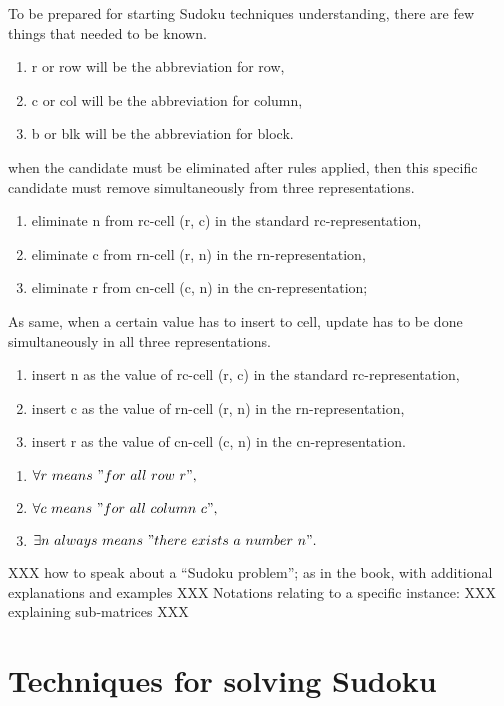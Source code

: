 \documentclass[11pt]{report}
\begin{document}
To be prepared for starting Sudoku techniques understanding, there are few things that needed to be known.
\begin{enumerate}
\item r or row will be the abbreviation for row,
\item c or col will be the abbreviation for column,
\item b or blk will be the abbreviation for block.
\end{enumerate}
when the candidate must be eliminated after rules applied, then this specific candidate must remove simultaneously from three representations.
\begin{enumerate}
\item eliminate n from rc-cell (r, c) in the standard rc-representation,
\item eliminate c from rn-cell (r, n) in the rn-representation,
\item eliminate r from cn-cell (c, n) in the cn-representation;
\end{enumerate}
As same, when a certain value has to insert to cell, update has to be done simultaneously in all three representations.
\begin{enumerate}
\item insert n as the value of rc-cell (r, c) in the standard rc-representation,
\item insert c as the value of rn-cell (r, n) in the rn-representation,
\item insert r as the value of cn-cell (c, n) in the cn-representation.
\end{enumerate}
\begin{enumerate}
\item $\forall r\ means\ "for\ all\ row\ r",$
\item $\forall c\ means\ "for\ all\ column\ c",$
\item $\exists n\ always\ means\ "there\ exists\ a\ number\ n".$
\end{enumerate}

XXX how to speak about a ``Sudoku problem''; as in the book, with additional explanations and examples XXX
Notations relating to a specific instance: XXX explaining sub-matrices XXX








\chapter{Techniques for solving Sudoku}
\label{sec:Techniques}
\end{document}
